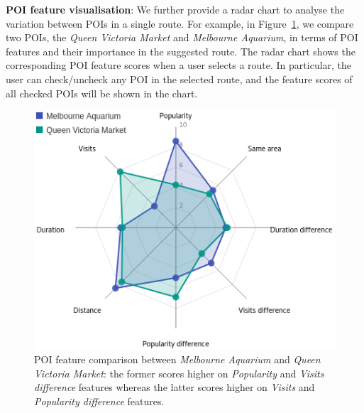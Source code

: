 \textbf{POI feature visualisation}: We further provide a radar chart to analyse the variation between POIs in a single route. 
For example, in Figure~\ref{fig:radar}, we compare two POIs, the \textit{Queen Victoria Market} and \textit{Melbourne Aquarium}, in terms of POI features and their importance in the suggested route. 
The radar chart shows the corresponding POI feature scores when a user selects a route.
In particular, the user can check/uncheck any POI in the selected route, and the feature scores of all checked POIs will be shown in the chart.

\begin{figure}[t!]
\includegraphics[width=0.6\linewidth]{figure/sample_radar.png} \vspace{-10pt}
    \caption{POI feature comparison between \textit{Melbourne Aquarium} and \textit{Queen Victoria Market}: the former scores higher on \textit{Popularity} and \textit{Visits difference} features whereas the latter scores higher on \textit{Visits} and \textit{Popularity difference} features.}
\label{fig:radar} \vspace{-1em}
\end{figure}
